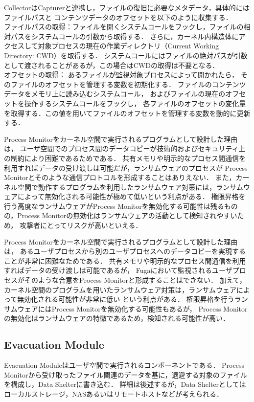 CollectorはCapturerと連携し，ファイルの復旧に必要なメタデータ，具体的にはファイルパスと
コンテンツデータのオフセットを以下のように収集する．
\\
ファイルパスの取得：ファイルを開くシステムコールをフックし，ファイルの相対パスをシステムコールの引数から取得する．
さらに，カーネル内構造体にアクセスして対象プロセスの現在の作業ディレクトリ（Current Working Directory: CWD）を取得する．
システムコールにはファイルの絶対パスが引数として渡されることがあるが，この場合はCWDの取得は不要となる．
\\
オフセットの取得：
あるファイルが監視対象プロセスによって開かれたら，
そのファイルのオフセットを管理する変数を初期化する．
ファイルのコンテンツデータをメモリ上に読み込むシステムコール，
およびファイルの現在のオフセットを操作するシステムコールをフックし，
各ファイルのオフセットの変化量を取得する．この値を用いてファイルのオフセットを管理する変数を動的に更新する．

Process Monitorをカーネル空間で実行されるプログラムとして設計した理由は，
ユーザ空間でのプロセス間のデータコピーが技術的およびセキュリティ上の制約により困難であるためである．
共有メモリや明示的なプロセス間通信を利用すればデータの受け渡しは可能だが，ランサムウェアのプロセスが
Process Monitorとそのような通信プロトコルを形成することはありえない．
また，カーネル空間で動作するプログラムを利用したランサムウェア対策には，ランサムウェアによって無効化される可能性が極めて低いという利点がある\cite{mitigation-modern}．
権限昇格を行う高度なランサムウェアがProcess Monitorを無効化する可能性は残るものの，Process Monitorの無効化はランサムウェアの活動として検知されやすいため，
攻撃者にとってリスクが高いといえる．

Process Monitorをカーネル空間で実行されるプログラムとして設計した理由は，
あるユーザプロセスから別のユーザプロセスへのデータコピーを実現することが非常に困難なためである．
共有メモリや明示的なプロセス間通信を利用すればデータの受け渡しは可能であるが，
Fugaにおいて監視されるユーザプロセスがそのような合意をProcess Monitorと形成することはできない．
加えて，カーネル空間のプログラムを用いたランサムウェア対策は，ランサムウェアによって無効化される可能性が非常に低い \cite{mitigation-modern}という利点がある．
権限昇格を行うランサムウェアにはProcess Monitorを無効化する可能性もあるが，
Process Monitorの無効化はランサムウェアの特徴であるため，検知される可能性が高い．

\subsection{Evacuation Module}
Evacuation Moduleはユーザ空間で実行されるコンポーネントである．
Process Monitorから受け取ったファイル関連のデータを基に，退避する対象のファイルを構成し，Data Shelterに書き込む．
詳細は後述するが，Data Shelterとしてはローカルストレージ，NASあるいはリモートホストなどが考えられる．

